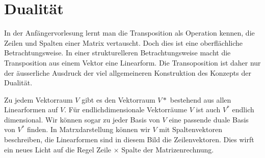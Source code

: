 %
%
%
\chapter{Dualität%
\label{chapter:dualitaet}}
In der Anfängervorlesung lernt man die Transposition als Operation kennen,
die Zeilen und Spalten einer Matrix vertauscht.
Doch dies ist eine oberflächliche Betrachtungsweise.
In einer strukturelleren Betrachtungsweise macht die Transposition
aus einem Vektor eine Linearform.
Die Transoposition ist daher nur der äusserliche Ausdruck der viel
allgemeineren Konstruktion des Konzepts der Dualität.

Zu jedem Vektorraum $V$ gibt es den Vektorraum $V*$ bestehend aus
allen Linearformen auf $V$.
Für endlichdimensionale Vektorräume $V$ ist auch $V^*$ endlich dimensional.
Wir können sogar zu jeder Basis von $V$ eine passende duale Basis von
$V^*$ finden.
In Matrxdarstellung können wir $V$ mit Spaltenvektoren beschreiben,
die Linearformen sind in diesem Bild die Zeilenvektoren.
Dies wirft ein neues Licht auf die Regel Zeile $\times$ Spalte der
Matrizenrechnung.

%






